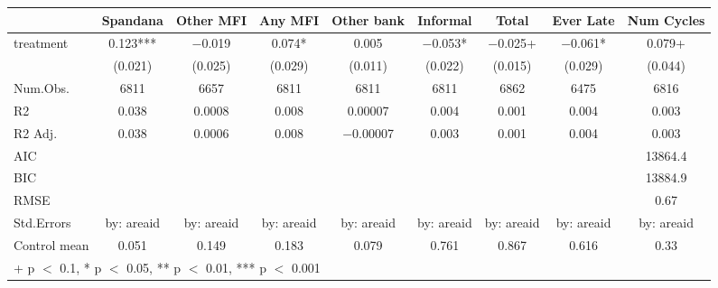 \begin{table}
\centering
\begin{tabular}[t]{lcccccccc}
\toprule
  & Spandana & Other MFI & Any MFI & Other bank & Informal & Total & Ever Late & Num Cycles\\
\midrule
treatment & \num{0.123}*** & \num{-0.019} & \num{0.074}* & \num{0.005} & \num{-0.053}* & \num{-0.025}+ & \num{-0.061}* & \num{0.079}+\\
 & (\num{0.021}) & (\num{0.025}) & (\num{0.029}) & (\num{0.011}) & (\num{0.022}) & (\num{0.015}) & (\num{0.029}) & (\num{0.044})\\
\midrule
Num.Obs. & \num{6811} & \num{6657} & \num{6811} & \num{6811} & \num{6811} & \num{6862} & \num{6475} & \num{6816}\\
R2 & \num{0.038} & \num{0.0008} & \num{0.008} & \num{0.00007} & \num{0.004} & \num{0.001} & \num{0.004} & \num{0.003}\\
R2 Adj. & \num{0.038} & \num{0.0006} & \num{0.008} & \num{-0.00007} & \num{0.003} & \num{0.001} & \num{0.004} & \num{0.003}\\
AIC &  &  &  &  &  &  &  & \num{13864.4}\\
BIC &  &  &  &  &  &  &  & \num{13884.9}\\
RMSE &  &  &  &  &  &  &  & \num{0.67}\\
Std.Errors & by: areaid & by: areaid & by: areaid & by: areaid & by: areaid & by: areaid & by: areaid & by: areaid\\
Control mean & \num{0.051} & \num{0.149} & \num{0.183} & \num{0.079} & \num{0.761} & \num{0.867} & \num{0.616} & \num{0.33}\\
\bottomrule
\multicolumn{9}{l}{\rule{0pt}{1em}+ p $<$ 0.1, * p $<$ 0.05, ** p $<$ 0.01, *** p $<$ 0.001}\\
\end{tabular}
\end{table}
